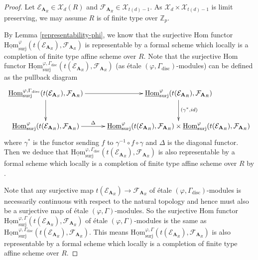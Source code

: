 \documentclass[10pt]{article}
\numberwithin{equation}{section}
\newcommand{\bZ}{{\mathbb Z}}
\newcommand{\calE}{{\mathcal E}}
\newcommand{\calF}{{\mathcal F}}
\newcommand{\calX}{{\mathcal X}}
\newcommand{\Hom}{{\mathrm{Hom}}}           %
\newcommand{\bfA}{{\textbf{A}}}
\newcommand{\disc}{\mathrm{disc}}
\newcommand{\surj}{\mathrm{surj}}
\begin{document}
\begin{proof}
Let $\calE_{\bfA_R}\in\calX_d(R)$ and $\calF_{\bfA_{R}}\in \calX_{t(d)-1}$. As $\calX_d\times \calX_{t(d)-1}$ is limit preserving, we may assume $R$ is of finite type over $\bZ_p$.

By Lemma \ref{representability-phi}, we know that the surjective Hom functor $\underline\Hom_{\surj}^{\varphi}(t(\calE_{\bfA_R}),\calF_{\bfA_{R}})$ is representable by a formal scheme which locally is a completion of finite type affine scheme over $R$. Note that the surjective Hom functor $\underline\Hom_{\surj}^{\varphi,\Gamma_{\disc}}(t(\calE_{\bfA_R}),\calF_{\bfA_R})$ (as \'etale $(\varphi,\Gamma_{\disc})$-modules) can be defined as the pullback diagram
 \begin{equation}
     \xymatrix@=1cm{
     \underline\Hom_{\surj}^{\varphi,\Gamma_{\disc}}(t(\calE_{\bfA_S}),\calF_{\bfA_R})\ar[d]\ar[r]& \underline\Hom_{\surj}^{\varphi}(t(\calE_{\bfA_R}),\calF_{\bfA_{R}})\ar[d]^{(\gamma^*,id)}\\
     \underline\Hom_{\surj}^{\varphi}(t(\calE_{\bfA_R}),\calF_{\bfA_{R}})\ar[r]^-{\Delta} &\underline\Hom_{\surj}^{\varphi}(t(\calE_{\bfA_R}),\calF_{\bfA_{R}})\times \underline\Hom_{\surj}^{\varphi}(t(\calE_{\bfA_R}),\calF_{\bfA_{R}})
     }
 \end{equation}
 where $\gamma^*$ is the functor sending $f$ to $\gamma^{-1}\circ f\circ \gamma $ and $\Delta$ is the diagonal functor. Then we deduce that $\underline\Hom_{\surj}^{\varphi,\Gamma_{\disc}}(t(\calE_{\bfA_R}),\calF_{\bfA_R})$ is also representable by a formal scheme which locally is a completion of finite type affine scheme over $R$ by \cite[\href{https://stacks.math.columbia.edu/tag/0AIP}{Tag 0AIP}]{stacks-project}.
 
 Note that any surjective map $t(\calE_{\bfA_R})\to \calF_{\bfA_R}$ of \'etale $(\varphi,\Gamma_{\disc})$-modules is necessarily continuous with respect to the natural topology and hence must also be a surjective map of \'etale $(\varphi,\Gamma)$-modules. So the surjective Hom functor $\underline\Hom_{\surj}^{\varphi,\Gamma}(t(\calE_{\bfA_R}),\calF_{\bfA_R})$ of \'etale $(\varphi,\Gamma)$-modules is the same as $\underline\Hom_{\surj}^{\varphi,\Gamma_{\disc}}(t(\calE_{\bfA_R}),\calF_{\bfA_R})$. This means $\underline\Hom_{\surj}^{\varphi,\Gamma}(t(\calE_{\bfA_R}),\calF_{\bfA_R})$ is also representable by a formal scheme which locally is a completion of finite type affine scheme over $R$.

\end{proof}
\end{document}
